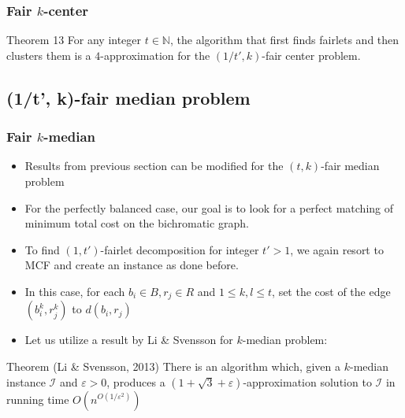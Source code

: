 \documentclass{beamer}
\begin{document}


\begin{frame}
\frametitle{Fair $k$-center}

\begin{block}{Theorem 13}
For any integer $t \in \mathbb{N}$, the algorithm that first finds fairlets and then clusters them is a $4$-approximation for the $(1/t', k)$-fair center problem.

\end{block}

\end{frame}


\subsection{(1/t', k)-fair median problem}

\begin{frame}
\frametitle{Fair $k$-median}

\begin{itemize}
	\item Results from previous section can be modified for the $(t, k)$-fair median problem \pause
	
	\item For the perfectly balanced case, our goal is to look for a perfect matching of minimum total cost on the bichromatic graph. \pause
	
	\item To find $(1, t')$-fairlet decomposition for integer $t' > 1$, we again resort to MCF and create an instance as done before. \pause
	
	\item In this case, for each $b_i \in B, r_j \in R$ and $1 \leq k, l \leq t$, set the cost of the edge $(b_i^k, r_j^k)$ to $d(b_i, r_j)$ \pause
	
	\item Let us utilize a result by Li \& Svensson for $k$-median problem:
\end{itemize}

\begin{block}{Theorem (Li \& Svensson, 2013)}
There is an algorithm which, given a $k$-median instance $\mathcal{I}$ and $\varepsilon > 0$, produces a $(1 + \sqrt{3} + \varepsilon)$-approximation solution to $\mathcal{I}$ in running time $O \left( n^{O(1 / \varepsilon^2)} \right)$

\end{block}

\end{frame}
\end{document}
